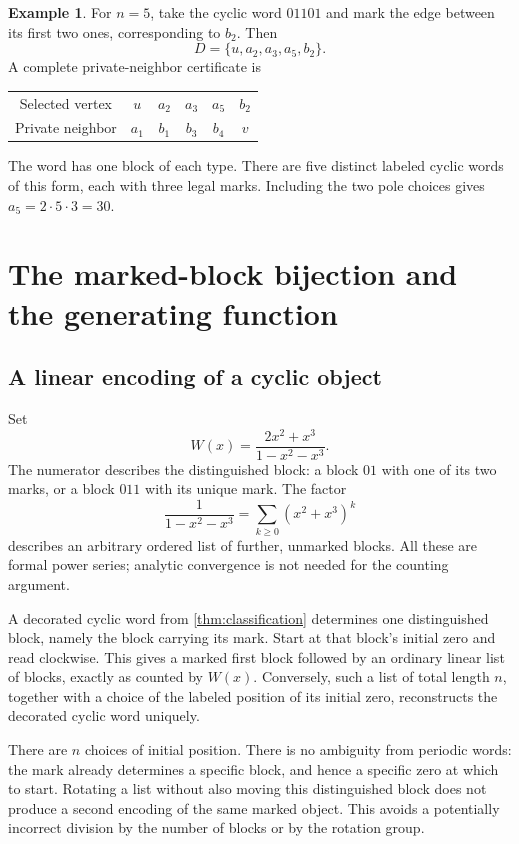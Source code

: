 \documentclass[11pt,letterpaper]{article}
\numberwithin{equation}{section}
\theoremstyle{definition}
\newtheorem{example}[theorem]{Example}
\theoremstyle{remark}
\begin{document}
\begin{example}\label{ex:n5}
For $n=5$, take the cyclic word $01101$ and mark the edge between
its first two ones, corresponding to $b_2$. Then
\[
 D=\{u,a_2,a_3,a_5,b_2\}.
\]
A complete private-neighbor certificate is
\begin{center}
\begin{tabular}{c@{\qquad}ccccc}
\toprule
Selected vertex & $u$ & $a_2$ & $a_3$ & $a_5$ & $b_2$\\
Private neighbor & $a_1$ & $b_1$ & $b_3$ & $b_4$ & $v$\\
\bottomrule
\end{tabular}
\end{center}
The word has one block of each type. There are five distinct labeled
cyclic words of this form, each with three legal marks. Including
the two pole choices gives $a_5=2\cdot5\cdot3=30$.
\end{example}

\section{The marked-block bijection and the generating function}

\subsection{A linear encoding of a cyclic object}
Set
\begin{equation}\label{eq:W}
 W(x)=\frac{2x^2+x^3}{1-x^2-x^3}.
\end{equation}
The numerator describes the distinguished block: a block $01$ with
one of its two marks, or a block $011$ with its unique mark. The
factor
\[
 \frac1{1-x^2-x^3}=\sum_{k\ge0}(x^2+x^3)^k
\]
describes an arbitrary ordered list of further, unmarked blocks.
All these are formal power series; analytic convergence is not
needed for the counting argument.

A decorated cyclic word from \cref{thm:classification} determines
one distinguished block, namely the block carrying its mark. Start
at that block's initial zero and read clockwise. This gives a
marked first block followed by an ordinary linear list of blocks,
exactly as counted by $W(x)$. Conversely, such a list of total
length $n$, together with a choice of the labeled position of its
initial zero, reconstructs the decorated cyclic word uniquely.

There are $n$ choices of initial position. There is no ambiguity
from periodic words: the mark already determines a specific block,
and hence a specific zero at which to start. Rotating a list without
also moving this distinguished block does not produce a second
encoding of the same marked object. This avoids a potentially
incorrect division by the number of blocks or by the rotation group.
\end{document}
